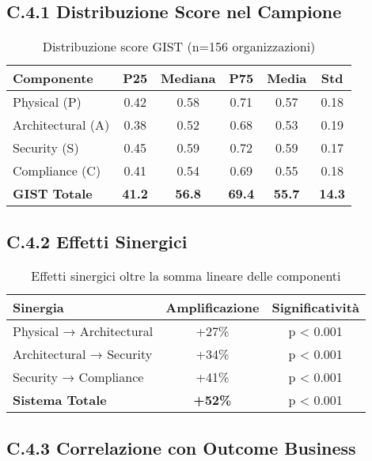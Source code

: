 \subsection{\texorpdfstring{\textbf{C.4.1 Distribuzione Score nel Campione}}{C.4.1 - Distribuzione Score nel Campione}}

\begin{table}[htbp]
\centering
\begin{tabular}{lccccc}
\toprule
\textbf{Componente} & \textbf{P25} & \textbf{Mediana} & \textbf{P75} & \textbf{Media} & \textbf{Std} \\
\midrule
Physical (P) & 0.42 & 0.58 & 0.71 & 0.57 & 0.18 \\
Architectural (A) & 0.38 & 0.52 & 0.68 & 0.53 & 0.19 \\
Security (S) & 0.45 & 0.59 & 0.72 & 0.59 & 0.17 \\
Compliance (C) & 0.41 & 0.54 & 0.69 & 0.55 & 0.18 \\
\textbf{GIST Totale} & \textbf{41.2} & \textbf{56.8} & \textbf{69.4} & \textbf{55.7} & \textbf{14.3} \\
\bottomrule
\end{tabular}
\caption{Distribuzione score GIST (n=156 organizzazioni)}
\end{table}

\subsection{\texorpdfstring{\textbf{C.4.2 Effetti Sinergici}}{C.4.2 - Effetti Sinergici}}

\begin{table}[htbp]
\centering
\begin{tabular}{lcc}
\toprule
\textbf{Sinergia} & \textbf{Amplificazione} & \textbf{Significatività} \\
\midrule
Physical → Architectural & +27\% & p < 0.001 \\
Architectural → Security & +34\% & p < 0.001 \\
Security → Compliance & +41\% & p < 0.001 \\
\textbf{Sistema Totale} & \textbf{+52\%} & p < 0.001 \\
\bottomrule
\end{tabular}
\caption{Effetti sinergici oltre la somma lineare delle componenti}
\end{table}

\subsection{\texorpdfstring{\textbf{C.4.3 Correlazione con Outcome Business}}{C.4.3 - Correlazione con Outcome Business}}

